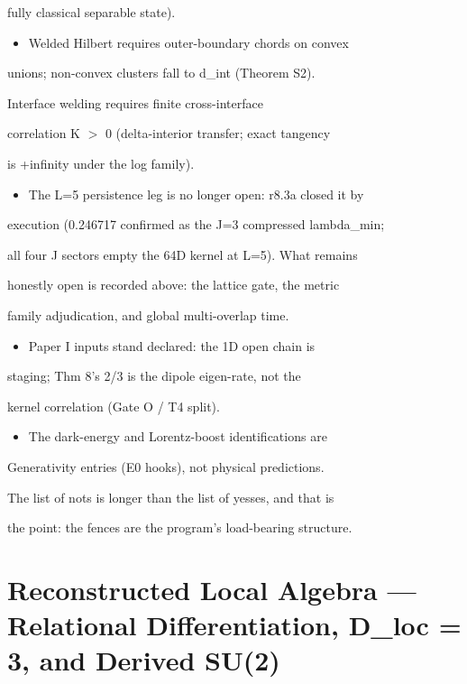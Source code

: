 \documentclass[11pt,a4paper]{article}
\theoremstyle{definition}
\begin{document}
    fully classical separable state).

\begin{itemize}[leftmargin=1.4em]
\item Welded Hilbert requires outer-boundary chords on convex
\end{itemize}
    unions; non-convex clusters fall to d\_int (Theorem S2).

    Interface welding requires finite cross-interface

    correlation K $>$ 0 (delta-interior transfer; exact tangency

    is +infinity under the log family).

\begin{itemize}[leftmargin=1.4em]
\item The L=5 persistence leg is no longer open: r8.3a closed it by
\end{itemize}
    execution (0.246717 confirmed as the J=3 compressed lambda\_min;

    all four J sectors empty the 64D kernel at L=5). What remains

    honestly open is recorded above: the lattice gate, the metric

    family adjudication, and global multi-overlap time.

\begin{itemize}[leftmargin=1.4em]
\item Paper I inputs stand declared: the 1D open chain is
\end{itemize}
    staging; Thm 8's 2/3 is the dipole eigen-rate, not the

    kernel correlation (Gate O / T4 split).

\begin{itemize}[leftmargin=1.4em]
\item The dark-energy and Lorentz-boost identifications are
\end{itemize}
    Generativity entries (E0 hooks), not physical predictions.

The list of nots is longer than the list of yesses, and that is

the point: the fences are the program's load-bearing structure.



\section{Reconstructed Local Algebra — Relational Differentiation, D\_loc = 3, and Derived SU(2)}
\end{document}

